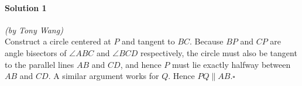 \documentclass[10pt]{article}
\begin{document}
	\paragraph{Solution 1} \textit{(by Tony Wang)}\\
	
	\noindent Construct a circle centered at \(P\) and tangent to \(BC\). Because \(BP\) and \(CP\) are angle bisectors of \(\angle ABC\) and \(\angle BCD\) respectively, the circle must also be tangent to the parallel lines \(AB\) and \(CD\), and hence \(P\) must lie exactly halfway between \(AB\) and \(CD\). A similar argument works for \(Q\). Hence \(PQ \parallel AB\).\hfill\ensuremath{\square}\\
	

\end{document}
